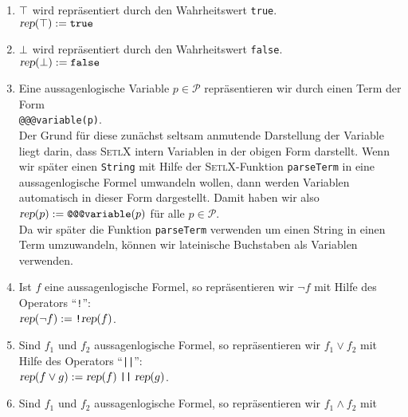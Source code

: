 \begin{enumerate}
\item $\top$ wird repr\"{a}sentiert durch den Wahrheitswert \texttt{true}.
      \\[0.2cm]
      \hspace*{1.3cm}
      $\textsl{rep}(\top) := \texttt{true}$
\item $\bot$  wird repr\"{a}sentiert durch den Wahrheitswert \texttt{false}.
      \\[0.2cm]
      \hspace*{1.3cm}
      $\textsl{rep}(\bot) := \texttt{false}$
\item Eine aussagenlogische Variable $p \in \mathcal{P}$ repr\"{a}sentieren wir 
      durch einen Term der Form
      \\[0.2cm]
      \hspace*{1.3cm}
      \texttt{@@@variable(p)}.
      \\[0.2cm]
      Der Grund f\"{u}r diese zun\"{a}chst seltsam anmutende Darstellung der Variable liegt darin,
      dass \textsc{SetlX} intern Variablen in der obigen Form darstellt.  Wenn wir sp\"{a}ter
      einen \texttt{String} mit Hilfe der \textsc{SetlX}-Funktion \texttt{parseTerm} in eine
      aussagenlogische Formel umwandeln wollen, dann werden Variablen automatisch in dieser Form
      dargestellt. Damit haben wir also
      \\[0.2cm]
      \hspace*{1.3cm}
      $\textsl{rep}(p) := \texttt{@@@variable}(p)$ \quad f\"{u}r alle $p \in \mathcal{P}$.
      \\[0.2cm]
      Da wir sp\"ater die Funktion \texttt{parseTerm} verwenden um einen String in einen Term umzuwandeln,
      k\"onnen wir lateinische Buchstaben als Variablen verwenden.
\item Ist $f$ eine aussagenlogische Formel, so repr\"{a}sentieren wir $\neg f$ mit Hilfe des Operators
      ``\texttt{!}'': \\[0.2cm]
      \hspace*{1.3cm} 
      $\textsl{rep}(\neg f) := \texttt{!} \textsl{rep}(f)$.
\item Sind $f_1$ und $f_2$ aussagenlogische Formel, so repr\"{a}sentieren wir $f_1 \vee f_2$ mit
      Hilfe des Operators  ``\texttt{||}'': \\[0.2cm]
      \hspace*{1.3cm} 
      $\textsl{rep}(f \vee g) := \textsl{rep}(f) \;\texttt{||}\; \textsl{rep}(g)$.
\item Sind $f_1$ und $f_2$ aussagenlogische Formel, so repr\"{a}sentieren wir $f_1 \wedge f_2$ mit

\end{enumerate}
